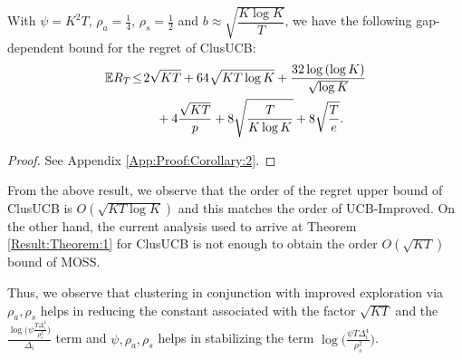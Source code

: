 \begin{corollary}
\label{Result:Corollary:2}
With $\psi=K^{2}T$, $\rho_{a}=\frac{1}{4}$, $\rho_{s}=\frac{1}{2}$ and $b\approx\sqrt{\dfrac{K\log K}{T}}$, 
 we have the following gap-dependent bound for the regret of ClusUCB:
\begin{align*}
\mathbb{E} R_T &\!\le\! 2\sqrt{KT} + 64\sqrt{KT\log K} + \dfrac{32\log{(\log K)}}{\sqrt{\log K}} \\
&\qquad+ 4\dfrac{\sqrt{KT}}{p}  + 8\sqrt{\dfrac{T}{K\log K}} + 8\sqrt{\dfrac{T}{e}} .
\end{align*}
\end{corollary}
\begin{proof}
 See Appendix \ref{App:Proof:Corollary:2}.
\end{proof}


From the above result, we observe that the order of the regret upper bound of ClusUCB is $O(\sqrt{KT\log K})$ and this matches the order of UCB-Improved. On the other hand, the current analysis used to arrive at Theorem \ref{Result:Theorem:1} for ClusUCB is not enough to obtain the order $O(\sqrt{KT})$ bound of MOSS.

Thus, we observe that clustering in conjunction with improved exploration via $\rho_{a},\rho_{s}$ helps in reducing the constant associated with the factor $\sqrt{KT}$ and the $\frac{\log\bigg(\psi\frac{T\Delta_{i}^{4}}{\rho_{s}^{2}}\bigg)}{\Delta_{i}}$ 
term and $\psi,\rho_{a},\rho_{s}$ helps in stabilizing the term $\log\bigg(\frac{\psi  T\Delta_{i}^{4}}{\rho_{s}^{2}}\bigg)$.

% 
%
%
%
%
%
